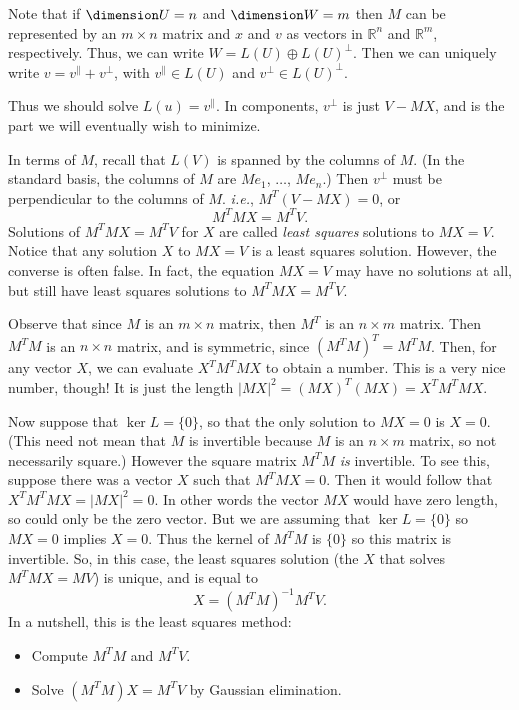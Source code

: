 Note that if $\dimension U=n$ and $\dimension W=m$ then $M$ can be represented by an $m\times n$ matrix and $x$ and $v$ as vectors in $\mathbb{R}^n$ and $\mathbb{R}^m$, respectively. Thus, we can write $W=L(U)\oplus L(U)^\perp$.  Then we can uniquely write $v=v^\parallel + v^\perp$, with $v^\parallel \in L(U)$ and $v^\perp \in L(U)^\perp$.  



Thus we should solve $L(u)=v^\parallel$.  In components, $v^\perp$ is just $V-MX$, and is the part we will eventually wish to minimize.  

In terms of $M$, recall that $L(V)$ is spanned by the columns of $M$.  (In the standard basis, the columns of $M$ are $Me_1$, 
$\ldots$, $Me_n$.)  Then $v^\perp$ must be perpendicular to the columns of $M$.  \textit{i.e.}, $M^T(V-MX)=0$, or
\[
M^TMX = M^TV.
\]
Solutions of $M^TMX = M^TV$ for $X$ are called \emph{least squares} solutions to $MX=V$.  
Notice that any solution $X$ to $MX=V$ is a least squares solution.  However, the converse is often false.  In fact, the equation $MX=V$ may have no solutions at all, but still have least squares solutions to $M^TMX = M^TV$.

Observe that since $M$ is an $m\times n$ matrix, then $M^T$ is an $n\times m$ matrix.  Then $M^TM$ is an $n\times n$ matrix, and is symmetric, since $(M^TM)^T=M^TM$.  Then, for any vector $X$, we can evaluate $X^TM^TMX$ to obtain a number.  This is a very nice number, though!  It is just the length $|MX|^2 = (MX)^T(MX)=X^TM^TMX$.


Now suppose that $\ker L=\{0\}$, so that the only solution to $MX=0$ is $X=0$. (This need not mean that $M$ is invertible because $M$ is an $n\times m $ matrix, so not necessarily square.) 
However the square matrix $M^TM$ {\itshape is} invertible. To see this, suppose there was a vector $X$ such that 
$M^T M X=0$. Then it would follow that $X^T M^T M X = |M X|^2=0$. In other words the vector $MX$ would have zero length, so could only be the zero vector. But we are assuming that $\ker L=\{0\}$ so $MX=0$ implies $X=0$. Thus the kernel of $M^TM$ is $\{0\}$ so this matrix is invertible.
So, in this case, the least squares solution (the $X$ that solves $M^TMX=MV$) is unique, and is equal to 
\[
X = (M^TM)^{-1}M^TV.
\]
In a nutshell, this is the least squares method:

\begin{itemize}
\item Compute $M^TM$ and $M^TV$.
\item Solve $(M^TM)X=M^TV$ by Gaussian elimination.
\end{itemize}


